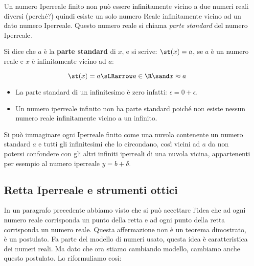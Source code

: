 Un numero Iperreale finito non può essere infinitamente vicino 
a due numeri reali diversi (perché?) quindi esiste un solo numero Reale 
infinitamente vicino ad un dato numero Iperreale. 
Questo numero reale si chiama \emph{parte standard} del numero Iperreale.

% 

\begin{definizione}
 Si dice che \(a\) è la \textbf{parte standard} di \(x\), e si scrive: 
 \(\st(x) = a\), se \(a\) è un numero reale e \(x\) è 
infinitamente vicino ad \(a\):

\[\st(x) = a \sLRarrow a \in \R \sand x \approx a\]
\end{definizione}

\begin{osservazione}
\begin{itemize} [nosep]
 \item 
La parte standard di un infinitesimo è zero infatti:
\(\epsilon = 0+\epsilon\).
 \item 
Un numero iperreale infinito non ha parte standard poiché non esiste nessun 
numero reale infinitamente vicino a un infinito.
\end{itemize}
\end{osservazione}

Si può immaginare ogni Iperreale finito come una
nuvola contenente un numero standard \(a\) e tutti gli infinitesimi che lo 
circondano, così vicini ad \(a\) da non potersi confondere con gli altri 
infiniti iperreali di una nuvola vicina, appartenenti per esempio al numero 
iperreale \(y=b+\delta\). 



\subsection{Retta Iperreale e strumenti ottici}
\label{subsec:insnum_retta}

In un paragrafo precedente abbiamo visto che si può accettare l'idea che 
ad ogni numero reale corrisponda un punto della retta e ad ogni 
punto della retta corrisponda un numero reale. 
Questa affermazione non è un teorema dimostrato, è un postulato. 
Fa parte del modello di numeri usato, questa idea è caratteristica dei 
numeri reali. 
Ma dato che ora stiamo cambiando modello, cambiamo anche questo postulato. 
Lo riformuliamo così:

